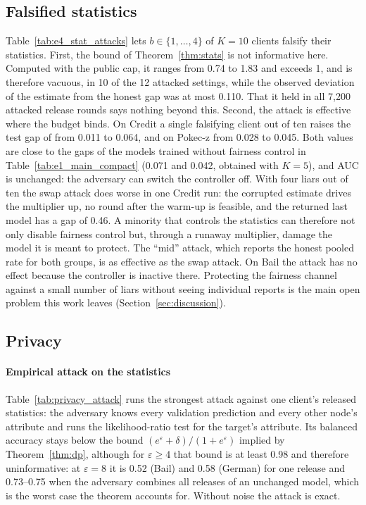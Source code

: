 \subsection{Falsified statistics}\label{sec:statattack}



Table~\ref{tab:e4_stat_attacks} lets $b\in\{1,\dots,4\}$ of $K=10$ clients falsify their statistics. First, the bound of Theorem~\ref{thm:stats} is not informative here. Computed with the public cap, it ranges from 0.74 to 1.83 and exceeds 1, and is therefore vacuous, in 10 of the 12 attacked settings, while the observed deviation of the estimate from the honest gap was at most 0.110. That it held in all 7{,}200 attacked release rounds says nothing beyond this. Second, the attack is effective where the budget binds. On Credit a single falsifying client out of ten raises the test gap of \clamp{} from 0.011 to 0.064, and on Pokec-z from 0.028 to 0.045. Both values are close to the gaps of the models trained without fairness control in Table~\ref{tab:e1_main_compact} (0.071 and 0.042, obtained with $K=5$), and AUC is unchanged: the adversary can switch the controller off. With four liars out of ten the swap attack does worse in one Credit run: the corrupted estimate drives the multiplier up, no round after the warm-up is feasible, and the returned last model has a gap of 0.46. A minority that controls the statistics can therefore not only disable fairness control but, through a runaway multiplier, damage the model it is meant to protect. The ``mid'' attack, which reports the honest pooled rate for both groups, is as effective as the swap attack. On Bail the attack has no effect because the controller is inactive there. Protecting the fairness channel against a small number of liars without seeing individual reports is the main open problem this work leaves (Section~\ref{sec:discussion}).

\subsection{Privacy}\label{sec:privacy}



\paragraph{Empirical attack on the statistics}
Table~\ref{tab:privacy_attack} runs the strongest attack against one client's released statistics: the adversary knows every validation prediction and every other node's attribute and runs the likelihood-ratio test for the target's attribute. Its balanced accuracy stays below the bound $(e^\varepsilon+\delta)/(1+e^\varepsilon)$ implied by Theorem~\ref{thm:dp}, although for $\varepsilon\ge4$ that bound is at least 0.98 and therefore uninformative: at $\varepsilon=8$ it is 0.52 (Bail) and 0.58 (German) for one release and 0.73--0.75 when the adversary combines all releases of an unchanged model, which is the worst case the theorem accounts for. Without noise the attack is exact.

